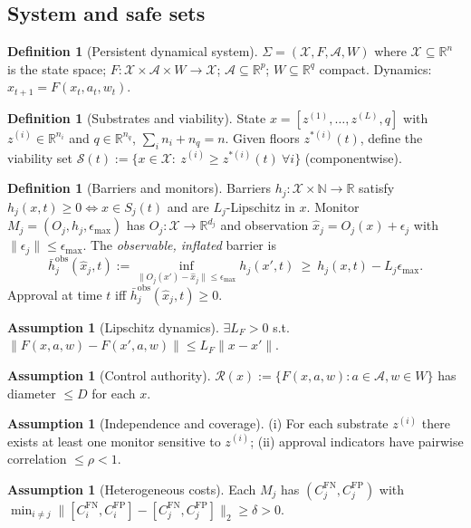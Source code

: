\documentclass[11pt]{article}
\theoremstyle{definition}
\newtheorem{definition}[theorem]{Definition}
\newtheorem{assumption}[theorem]{Assumption}
\newcommand{\X}{\mathcal{X}}
\newcommand{\A}{\mathcal{A}}
\newcommand{\Sset}{\mathcal{S}}
\newcommand{\R}{\mathbb{R}}
\begin{document}
\subsection{System and safe sets}
\begin{definition}[Persistent dynamical system]\label{def:system}
$\Sigma=(\X,F,\A,W)$ where $\X\subseteq\R^n$ is the state space; $F:\X\times \A\times W\to \X$; $\A\subseteq\R^p$; $W\subseteq\R^q$ compact. Dynamics: $x_{t+1}=F(x_t,a_t,w_t)$.
\end{definition}

\begin{definition}[Substrates and viability]\label{def:substrate}
State $x=[z^{(1)},\dots,z^{(L)},q]$ with $z^{(i)}\in\R^{n_i}$ and $q\in\R^{n_q}$, $\sum_i n_i+n_q=n$. Given floors $z^{*(i)}(t)$, define the viability set $\Sset(t):=\{x\in\X:\ z^{(i)}\ge z^{*(i)}(t)\ \forall i\}$ (componentwise).
\end{definition}

\begin{definition}[Barriers and monitors]\label{def:barrier_monitor}
Barriers $h_j:\X\times\mathbb N\to\R$ satisfy $h_j(x,t)\ge 0\iff x\in S_j(t)$ and are $L_j$-Lipschitz in $x$. Monitor $M_j=(O_j,h_j,\epsilon_{\max})$ has $O_j:\X\to\R^{d_j}$ and observation $\hat x_j=O_j(x)+\epsilon_j$ with $\|\epsilon_j\|\le \epsilon_{\max}$. The \emph{observable, inflated} barrier is
\[
\bar h^{\mathrm{obs}}_j(\hat x_j,t):=\inf_{\|O_j(x')-\hat x_j\|\le \epsilon_{\max}} h_j(x',t)\ \ge\ h_j(x,t)-L_j\epsilon_{\max}.
\]
Approval at time $t$ iff $\bar h^{\mathrm{obs}}_j(\hat x_j,t)\ge 0$.
\end{definition}

\begin{assumption}[Lipschitz dynamics]\label{ass:lipsF}
$\exists L_F>0$ s.t. $\|F(x,a,w)-F(x',a,w)\|\le L_F\|x-x'\|$.
\end{assumption}
\begin{assumption}[Control authority]\label{ass:authority}
$\mathcal R(x):=\{F(x,a,w):a\in\A,w\in W\}$ has diameter $\le D$ for each $x$.
\end{assumption}
\begin{assumption}[Independence and coverage]\label{ass:indep}
(i) For each substrate $z^{(i)}$ there exists at least one monitor sensitive to $z^{(i)}$; (ii) approval indicators have pairwise correlation $\le \rho<1$.
\end{assumption}
\begin{assumption}[Heterogeneous costs]\label{ass:hetero}
Each $M_j$ has $(C_j^{\mathrm{FN}},C_j^{\mathrm{FP}})$ with $\min_{i\neq j}\|[C^{\mathrm{FN}}_i,C^{\mathrm{FP}}_i]-[C^{\mathrm{FN}}_j,C^{\mathrm{FP}}_j]\|_2\ge \delta>0$.
\end{assumption}
\end{document}
